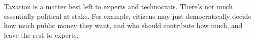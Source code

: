 Taxation is a matter best left to experts and technocrats. There's not much essentially political at stake. For example, citizens may just democratically decide how much public money they want, and who should contribute how much, and leave the rest to experts.
